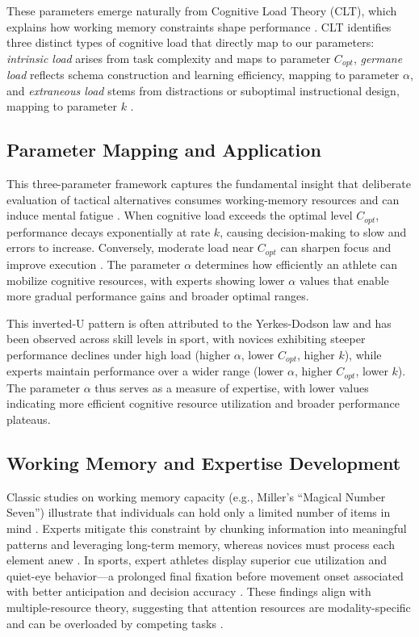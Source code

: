 \documentclass{article}
\begin{document}
These parameters emerge naturally from Cognitive Load Theory (CLT), which explains how working memory constraints shape
performance \citep{sweller1988}. CLT identifies three distinct types of cognitive load that directly map to our
parameters: \textit{intrinsic load} arises from task complexity and maps to parameter $C_{opt}$, \textit{germane load}
reflects schema construction and learning efficiency, mapping to parameter $\alpha$, and \textit{extraneous load} stems
from distractions or suboptimal instructional design, mapping to parameter $k$ \citep{paas2003}.

\subsection*{Parameter Mapping and Application}

This three-parameter framework captures the fundamental insight that deliberate evaluation of tactical alternatives
consumes working-memory resources and can induce mental fatigue \citep{beilock2001}. When cognitive load exceeds the
optimal level $C_{opt}$, performance decays exponentially at rate $k$, causing decision-making to slow and errors to
increase. Conversely, moderate load near $C_{opt}$ can sharpen focus and improve execution \citep{masters1992}. The
parameter $\alpha$ determines how efficiently an athlete can mobilize cognitive resources, with experts showing lower
$\alpha$ values that enable more gradual performance gains and broader optimal ranges.

This inverted-U pattern is often attributed to the Yerkes-Dodson law \citep{yerkes1908} and has been observed across
skill levels in sport, with novices exhibiting steeper performance declines under high load (higher $\alpha$, lower
$C_{opt}$, higher $k$), while experts maintain performance over a wider range (lower $\alpha$, higher $C_{opt}$, lower
$k$). The parameter $\alpha$ thus serves as a measure of expertise, with lower values indicating more efficient
cognitive resource utilization and broader performance plateaus.

\subsection*{Working Memory and Expertise Development}  Classic studies on working memory capacity (e.g., Miller’s
“Magical Number Seven”) illustrate that individuals can hold only a limited number of items in
mind \citep{sweller1988}.  Experts mitigate this constraint by chunking information into meaningful
patterns and leveraging long-term memory, whereas novices must process each element
anew \citep{macmahon2009}.  In sports, expert athletes display superior cue utilization and quiet-eye
behavior—a prolonged final fixation before movement onset associated with better anticipation and decision
accuracy \citep{wilson2009}.  These findings align with multiple-resource theory, suggesting that
attention resources are modality-specific and can be overloaded by competing
tasks \citep{vanmerrienboer2005}.
\end{document}
